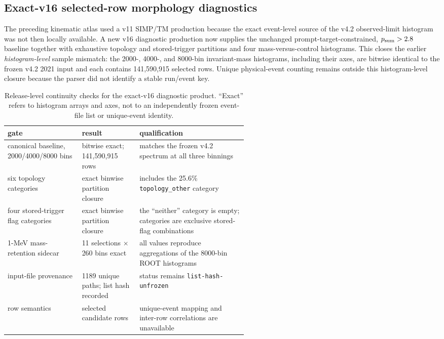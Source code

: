 \subsection{Exact-v16 selected-row morphology diagnostics}
\label{app:v4p3-exact-v16-diagnostics}

The preceding kinematic atlas used a v11 SIMP/TM production because the exact
event-level source of the v4.2 observed-limit histogram was not then locally
available.  A new v16 diagnostic production now supplies the unchanged
prompt-target-constrained, $p_{\rm sum}>2.8$ baseline together with exhaustive
topology and stored-trigger partitions and four mass-versus-control
histograms.  This closes the earlier \emph{histogram-level} sample mismatch:
the 2000-, 4000-, and 8000-bin invariant-mass histograms, including their
axes, are bitwise identical to the frozen v4.2 2021 input and each contains
141,590,915 selected rows.  Unique physical-event counting remains outside
this histogram-level closure because the parser did not identify a stable
run/event key.

\begin{table}[H]
\centering
\small
\caption{Release-level continuity checks for the exact-v16 diagnostic
product.  ``Exact'' refers to histogram arrays and axes, not to an
independently frozen event-file list or unique-event identity.}
\label{tab:v4p3-v16-provenance}
\begin{tabularx}{0.96\linewidth}{P{0.31\linewidth} P{0.24\linewidth} Y}
\toprule
gate & result & qualification \\
\midrule
canonical baseline, 2000/4000/8000 bins & bitwise exact; 141,590,915 rows &
matches the frozen v4.2 spectrum at all three binnings \\
six topology categories & exact binwise partition closure &
includes the 25.6\% \texttt{topology\_other} category \\
four stored-trigger flag categories & exact binwise partition closure &
the ``neither'' category is empty; categories are exclusive stored-flag combinations \\
1-MeV mass-retention sidecar & 11 selections $\times$ 260 bins exact &
all values reproduce aggregations of the 8000-bin ROOT histograms \\
input-file provenance & 1189 unique paths; list hash recorded &
status remains \texttt{list-hash-unfrozen} \\
row semantics & selected candidate rows &
unique-event mapping and inter-row correlations are unavailable \\
\bottomrule
\end{tabularx}
\end{table}

